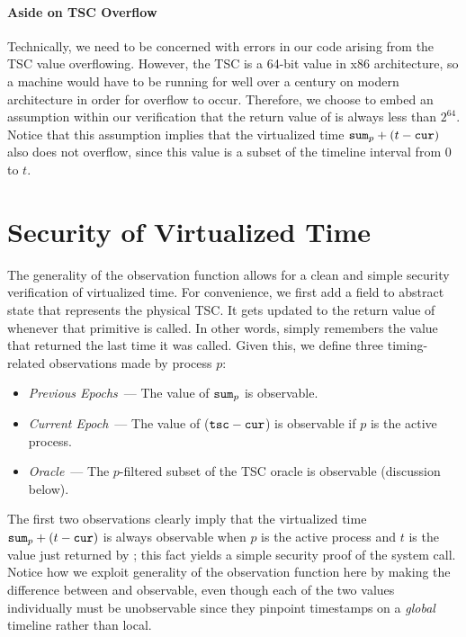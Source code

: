 \paragraph{Aside on TSC Overflow}
Technically, we need to be concerned with errors in our code arising
from the TSC value overflowing. However, the TSC is a 64-bit value 
in x86 architecture, so a machine would have to be running for
well over a century on modern architecture in order for overflow
to occur. Therefore, we choose to embed an assumption within our
verification that the return value of  is always
less than $2^{64}$. Notice that this assumption implies that
the virtualized time $\text{\tt{sum}}_p + (t - \text{\tt{cur}})$
also does not overflow, since this value is a subset of the
timeline interval from 0 to $t$.

\section{Security of Virtualized Time}
The generality of the observation function allows for a clean and
simple security verification of virtualized time. For convenience,
we first add a field  to abstract state that represents 
the physical TSC. It gets updated to the return value of 
whenever that primitive is called. In other words,  simply
remembers the value that  returned the last time it 
was called. Given this, we define three timing-related observations made 
by process $p$:
\begin{itemize}
\item \emph{Previous Epochs}~--- The value of $\text{\tt{sum}}_p$ is observable.
\item \emph{Current Epoch}~--- The value of ($\text{\tt{tsc}} - \text{\tt{cur}}$) is 
observable if $p$ is the active process.
\item \emph{Oracle}~--- The $p$-filtered subset of the TSC oracle is 
observable (discussion below).
\end{itemize}
The first two observations clearly imply that the virtualized time
$\text{\tt{sum}}_p + (t - \text{\tt{cur}})$ is always observable when
$p$ is the active process and $t$ is the value just returned by
; this fact yields a simple security proof
of the \gett{} system call. Notice how we exploit generality of the
observation function here by making the difference between 
and  observable, even though each of the two values individually
must be unobservable since they pinpoint timestamps on a \emph{global}
timeline rather than local.

